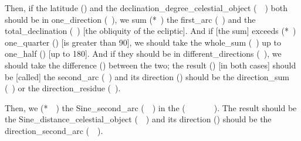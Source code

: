 \noindent\normalmarginpar{}

\clearpage{}

\noindent\reversemarginpar{}%
Then, if the \gls{latitude} (\ard) and the \gls{declination_degree_celestial_object} (\mayl\idafaconsonant\ \daraji\idafavowel\ \kawkab) both should be in \gls{one_direction} (\yik\ \jahat), we \gls{sum} (*\jam\ \kardan) the \gls{first_arc} (\qaws\idafaconsonant\ \avval) and the \gls{total_declination} (\mayl\idafaconsonant\ \kulli) [\ie the obliquity of the ecliptic]. And if [the sum] \gls{exceeds} (*\ziyadi\ \shudan) \gls{one_quarter} (\rabi) [\ie is greater than 90\degree], we should take the \gls{whole_sum} (\tamam\idafaconsonant\ \majmu) up to \gls{one_half} (\nisf) [\ie up to 180\degree]. And if they should be in \gls{different_directions} (\jahat\idafaconsonant\ \mukhtalif), we should take the \gls{difference} (\tafadul) between the two; the \gls{result} (\hasil) [in both cases] should be [called] 
the \gls{second_arc} (\qaws\idafaconsonant\ \duvum) and its \gls{direction} (\jahat) should be the \gls{direction_sum} (\jahat\idafaconsonant\ \majmu) or the \gls{direction_residue} (\jahat\idafaconsonant\ \fadla). 
\medskip

\noindent\reversemarginpar{}%
Then, we  (*\munhatt\idafaconsonant\ \darb\ \kardan) the \gls{Sine_second_arc} (\jayb\idafaconsonant\ \qaws\idafaconsonant\ \duvum) in the  (\jayb\idafaconsonant\ \tamam\idafaconsonant\ \bud\ \az\ \guillemotleft\dayiri\idafavowel\ \marri\ \biaqtab\idafaconsonant\ \arbai\guillemotright). The result should be the \gls{Sine_distance_celestial_object} (\jayb\idafaconsonant\ \bud\idafaconsonant\ \kawkab) and its \gls{direction} (\jahat) should be the \gls{direction_second_arc}  (\jahat\idafaconsonant\ \qaws\idafaconsonant\ \duvum). 

